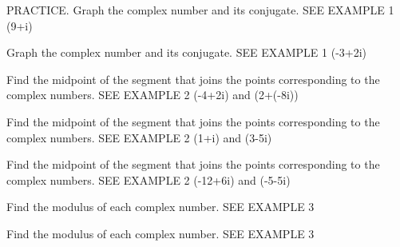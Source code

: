 \documentclass{article}
\newenvironment{practice}[2]{}{}        %
\newcommand{\answer}[1]{}               %
\newcommand{\placeholder}[2]{}          %
\newcommand{\te}[1]{}                   %
\begin{document}
\begin{practice}{17}{1}
PRACTICE. Graph the complex number and its conjugate. SEE EXAMPLE 1
(9+i)
\answer{See graph.}
\placeholder{graph}{Unit complex grid real [-1,10], imaginary [-5,5], double-arrowed R and i axes, O origin; real labels 2,4,6,8, imaginary -4i,-2i,2i,4i. Red filled (9,1),(9,-1), labeled 9+i and 9-i.}
\end{practice}
\begin{practice}{18}{1}
Graph the complex number and its conjugate. SEE EXAMPLE 1
(-3+2i)
\answer{See graph.}
\placeholder{graph}{Unit complex grid real [-7,4], imaginary [-5,5], double-arrowed R and i axes, O origin; real labels -6,-4,-2,2, imaginary -4i,-2i,2i,4i. Red filled (-3,2),(-3,-2), labeled -3+2i and -3-2i.}
\end{practice}
\begin{practice}{19}{1}
Find the midpoint of the segment that joins the points corresponding to the complex numbers. SEE EXAMPLE 2
(-4+2i) and (2+(-8i))
\answer{(-1,-3)}
\end{practice}
\begin{practice}{20}{1}
Find the midpoint of the segment that joins the points corresponding to the complex numbers. SEE EXAMPLE 2
(1+i) and (3-5i)
\answer{(2,-2)}
\end{practice}
\begin{practice}{21}{1}
Find the midpoint of the segment that joins the points corresponding to the complex numbers. SEE EXAMPLE 2
(-12+6i) and (-5-5i)
\answer{(-8.5,0.5)}
\end{practice}
\begin{practice}{22}{1}
Find the modulus of each complex number. SEE EXAMPLE 3
\placeholder{graph}{Complex plane, real grid spacing 2, imaginary spacing 1, window real [-2,20], imaginary [-5,5], double-arrowed R and i axes, O origin. Real labels 4,8,12,16, imaginary -4,-2,2,4. Red filled (18,-4) labeled 18-4i.}
\answer{(\sqrt{340}\approx18.44)}
\end{practice}
\begin{practice}{23}{1}
Find the modulus of each complex number. SEE EXAMPLE 3
\placeholder{graph}{Unit complex grid real [-10,1], imaginary [-5,5], double-arrowed R and i axes, O origin. Real labels -8,-6,-4,-2, imaginary -4,-2,2,4. Red filled point plotted at (-9,-2), labeled -9-i.}
\answer{(\sqrt{82}\approx9.06)}
\te{Printed point is at imaginary coordinate -2 but label and key use -1; likely the plotted point should be one unit higher.}
\end{practice}
\end{document}
